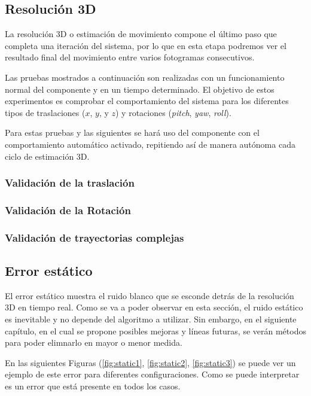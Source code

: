 \subsection{Resolución 3D}

La resolución 3D o estimación de movimiento compone el último paso que completa una iteración del sistema, por lo que en esta etapa podremos ver el resultado final del movimiento entre varios fotogramas consecutivos.

Las pruebas mostrados a continuación son realizadas con un funcionamiento normal del componente y en un tiempo determinado. El objetivo de estos experimentos es comprobar el comportamiento del sistema para los diferentes tipos de traslaciones ($x$, $y$, y $z$) y rotaciones (\textit{pitch}, \textit{yaw}, \textit{roll}).

Para estas pruebas y las siguientes se hará uso del componente con el comportamiento automático activado, repitiendo así de manera autónoma cada ciclo de estimación 3D.

\subsubsection{Validación de la traslación}
\subsubsection{Validación de la Rotación}
\subsubsection{Validación de trayectorias complejas}

\subsection{Error estático}

El error estático muestra el ruido blanco que se esconde detrás de la resolución 3D en tiempo real. Como se va a poder observar en esta sección, el ruido estático es inevitable y no depende del algoritmo a utilizar. Sin embargo, en el siguiente capítulo, en el cual se propone posibles mejoras y líneas futuras, se verán métodos para poder elimnarlo en mayor o menor medida.

En las siguientes Figuras (\ref{fig:static1}, \ref{fig:static2}, \ref{fig:static3}) se puede ver un ejemplo de este error para diferentes configuraciones. Como se puede interpretar es un error que está presente en todos los casos.

